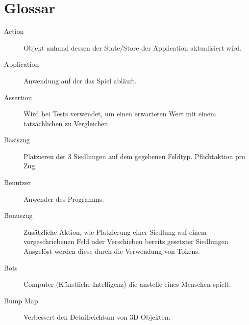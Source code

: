 \documentclass[a4paper]{scrreprt}
\begin{document}
\section{Glossar}
\begin{description}
	\item[Action] Objekt anhand dessen der State/Store der Application aktualisiert wird.
	\item[Application] Anwendung auf der das Spiel abläuft.
	\item[Assertion] Wird bei Tests verwendet, um einen erwarteten Wert mit einem tatsächlichen zu Vergleichen.
	\item[Basiszug] Platzieren der 3 Siedlungen auf dem gegebenen Feldtyp. Pflichtaktion pro Zug.
	\item[Benutzer] Anwender des Programms.
	\item[Bonuszug] Zusätzliche Aktion, wie Platzierung einer Siedlung auf einem vorgeschriebenen Feld oder Verschieben bereits gesetzter Siedlungen.
			     Ausgelöst werden diese durch die Verwendung von Tokens.
	\item[Bots]	Computer (Künstliche Intelligenz) die anstelle eines Menschen spielt.
	\item[Bump Map]	Verbessert den Detailreichtum von 3D Objekten.



\end{description}
\end{document}
